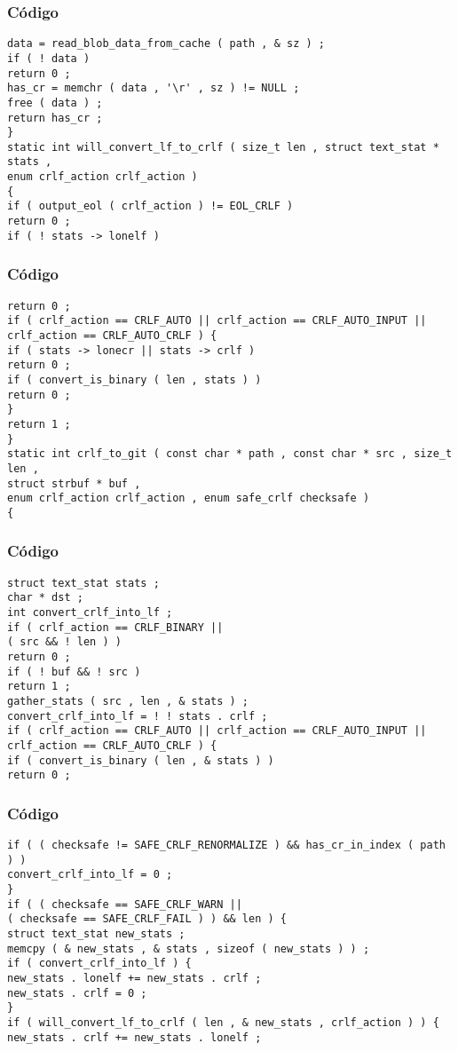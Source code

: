 \documentclass{beamer}
\begin{document}
\begin{frame}[fragile]
\frametitle{C\'odigo}
\begin{verbatim}
data = read_blob_data_from_cache ( path , & sz ) ; 
if ( ! data ) 
return 0 ; 
has_cr = memchr ( data , '\r' , sz ) != NULL ; 
free ( data ) ; 
return has_cr ; 
} 
static int will_convert_lf_to_crlf ( size_t len , struct text_stat * stats , 
enum crlf_action crlf_action ) 
{ 
if ( output_eol ( crlf_action ) != EOL_CRLF ) 
return 0 ; 
if ( ! stats -> lonelf ) 
\end{verbatim}
\end{frame}
\begin{frame}[fragile]
\frametitle{C\'odigo}
\begin{verbatim}
return 0 ; 
if ( crlf_action == CRLF_AUTO || crlf_action == CRLF_AUTO_INPUT || crlf_action == CRLF_AUTO_CRLF ) { 
if ( stats -> lonecr || stats -> crlf ) 
return 0 ; 
if ( convert_is_binary ( len , stats ) ) 
return 0 ; 
} 
return 1 ; 
} 
static int crlf_to_git ( const char * path , const char * src , size_t len , 
struct strbuf * buf , 
enum crlf_action crlf_action , enum safe_crlf checksafe ) 
{ 
\end{verbatim}
\end{frame}
\begin{frame}[fragile]
\frametitle{C\'odigo}
\begin{verbatim}
struct text_stat stats ; 
char * dst ; 
int convert_crlf_into_lf ; 
if ( crlf_action == CRLF_BINARY || 
( src && ! len ) ) 
return 0 ; 
if ( ! buf && ! src ) 
return 1 ; 
gather_stats ( src , len , & stats ) ; 
convert_crlf_into_lf = ! ! stats . crlf ; 
if ( crlf_action == CRLF_AUTO || crlf_action == CRLF_AUTO_INPUT || crlf_action == CRLF_AUTO_CRLF ) { 
if ( convert_is_binary ( len , & stats ) ) 
return 0 ; 
\end{verbatim}
\end{frame}
\begin{frame}[fragile]
\frametitle{C\'odigo}
\begin{verbatim}
if ( ( checksafe != SAFE_CRLF_RENORMALIZE ) && has_cr_in_index ( path ) ) 
convert_crlf_into_lf = 0 ; 
} 
if ( ( checksafe == SAFE_CRLF_WARN || 
( checksafe == SAFE_CRLF_FAIL ) ) && len ) { 
struct text_stat new_stats ; 
memcpy ( & new_stats , & stats , sizeof ( new_stats ) ) ; 
if ( convert_crlf_into_lf ) { 
new_stats . lonelf += new_stats . crlf ; 
new_stats . crlf = 0 ; 
} 
if ( will_convert_lf_to_crlf ( len , & new_stats , crlf_action ) ) { 
new_stats . crlf += new_stats . lonelf ; 
\end{verbatim}
\end{frame}
\end{document}
